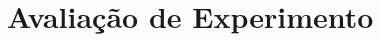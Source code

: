 \documentclass[aspectratio=169,t,xcolor=table]{beamer}
\begin{document}




















\section{Avaliação de Experimento}
\end{document}
